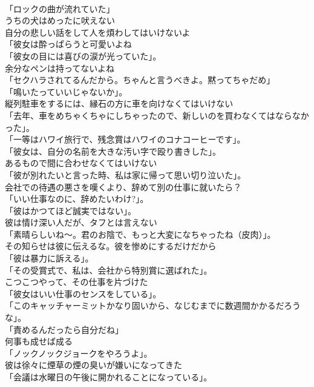 \documentclass[8pt]{extreport}
\begin{document}
\begin{CJK}{UTF8}{min}
\\	「ロックの曲が流れていた」	
\\	うちの犬はめったに吠えない	
\\	自分の悲しい話をして人を煩わしてはいけないよ	
\\	「彼女は酔っぱらうと可愛いよね	
\\	「彼女の目には喜びの涙が光っていた」。	
\\	余分なペンは持ってないよね	
\\	「セクハラされてるんだから。ちゃんと言うべきよ。黙ってちゃだめ」	
\\	「鳴いたっていいじゃないか」。	
\\	縦列駐車をするには、縁石の方に車を向けなくてはいけない	
\\	「去年、車をめちゃくちゃにしちゃったので、新しいのを買わなくてはならなかった」。	
\\	「一等はハワイ旅行で、残念賞はハワイのコナコーヒーです」。	
\\	「彼女は、自分の名前を大きな汚い字で殴り書きした」。	
\\	あるもので間に合わせなくてはいけない	
\\	「彼が別れたいと言った時、私は家に帰って思い切り泣いた」。	
\\	会社での待遇の悪さを嘆くより、辞めて別の仕事に就いたら？	
\\	「いい仕事なのに、辞めたいわけ?」。	
\\	「彼はかつてほど誠実ではない」。	
\\	彼は情け深い人だが、タフとは言えない	
\\	「素晴らしいね～。君のお陰で、もっと大変になちゃったね（皮肉）」。	
\\	その知らせは彼に伝えるな。彼を惨めにするだけだから	
\\	「彼は暴力に訴える」。	
\\	「その受賞式で、私は、会社から特別賞に選ばれた」。	
\\	こつこつやって、その仕事を片づけた	
\\	「彼女はいい仕事のセンスをしている」。	
\\	「このキャッチャーミットかなり固いから、なじむまでに数週間かかるだろうな」。	
\\	「責めるんだったら自分だね」	
\\	何事も成せば成る	
\\	「ノックノックジョークをやろうよ」。	
\\	彼は徐々に煙草の煙の臭いが嫌いになってきた	
\\	「会議は水曜日の午後に開かれることになっている」。	

\end{CJK}
\end{document}
